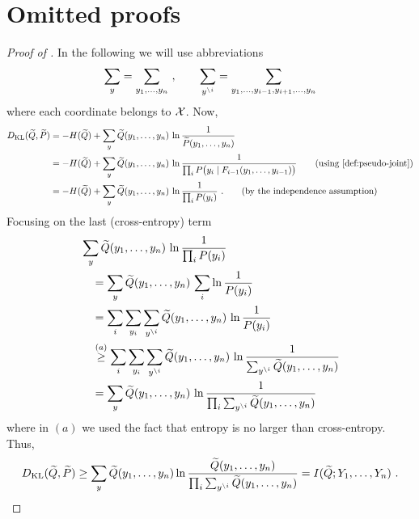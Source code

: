 %
\section{Omitted proofs}
\label{sec:omitted-proofs}
\begin{proof}[Proof of ]
\label{sec:proof:thm:MI}
In the following we will use abbreviations
\begin{align*}
  \sum_{y} = \sum_{y_1 ,\ldots, y_n }~, \qquad
  \sum_{y^{\backslash i}} = \sum_{y_1 ,\ldots, y_{i-1}, y_{i+1}, \ldots,  y_n }
\end{align*}
where each coordinate belongs to ${\mathcal{X}}$.
Now,
\begin{align*}
  D_{\KL}(\widetilde Q, \widetilde P)
  &=
    - H(\widetilde Q) + \sum_{y} \widetilde Q(y_1, \ldots, y_n) \, \ln \frac{1}{\widetilde P(y_1, \ldots, y_n)}\\
  &=
    - H(\widetilde Q) + \sum_{y} \widetilde Q(y_1, \ldots, y_n) \, \ln \frac{1}{\prod_i P\big(y_i \mid F_{i-1}(y_1, \ldots, y_{i-1}) \big)} \tag{using \Cref{def:pseudo-joint}}\\
  &=
    - H(\widetilde Q) + \sum_{y} \widetilde Q(y_1, \ldots, y_n) \, \ln \frac{1}{\prod_i P(y_i)}~. \tag{by the independence assumption}
\end{align*}
%
Focusing on the last (cross-entropy) term
\begin{align*}
  &\sum_{y} \widetilde Q(y_1, \ldots, y_n)  \, \ln \frac{1}{\prod_i P(y_i)}\\
  &\quad=
    \sum_{y} \widetilde Q(y_1, \ldots, y_n) \, \sum_i \ln \frac{1}{P(y_i)}\\
  &\quad=
    \sum_i \sum_{y_i} \sum_{y^{\backslash i}} \widetilde Q(y_1, \ldots, y_n) \, \ln \frac{1}{P(y_i)}\\
  &\quad\stackrel{(a)}{\geq}
    \sum_i \sum_{y_i} \sum_{y^{\backslash i}} \widetilde Q(y_1, \ldots, y_n) \, \ln \frac{1}{\sum_{y ^{\backslash i}}\widetilde Q(y_1, \ldots, y_n)}\\
  &\quad=
    \sum_{y} \widetilde Q(y_1, \ldots, y_n) \, \ln \frac{1}{\prod_i \sum_{y ^{\backslash i}}\widetilde Q(y_1, \ldots, y_n)}
\end{align*}
where in $(a)$ we used the fact that entropy is no larger than cross-entropy.
Thus,
%
\begin{align*}
  D_{\mathrm{KL}}(\widetilde Q, \widetilde P)
  \geq
  \sum_{y} \widetilde Q(y_1, \ldots, y_n) \ln \frac{\widetilde Q(y_1, \ldots, y_n)}{\prod_i \sum_{y ^{\backslash i}} \widetilde Q(y_1, \ldots, y_n)}
  =
  I(\widetilde {Q}; Y_1,\ldots, Y_n)~.
\end{align*}
%
\end{proof}